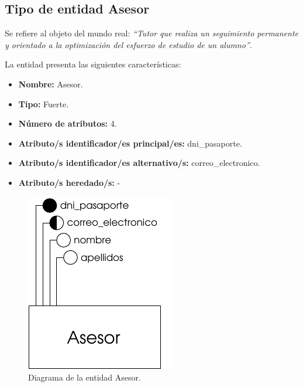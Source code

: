\subsection{Tipo de entidad Asesor}

   \begin{description}

   \item[Definición] Se refiere al objeto del mundo real: \emph{``Tutor que
        realiza un seguimiento permanente y orientado a la optimización del
        esfuerzo de estudio de un alumno''}.

   \item[Características] La entidad presenta las siguientes características:
      \begin{itemize}
         \item \textbf{Nombre:} Asesor.
         \item \textbf{Tipo:} Fuerte.
         \item \textbf{Número de atributos:} 4.
         \item \textbf{Atributo/s identificador/es principal/es:} dni\_pasaporte.
         \item \textbf{Atributo/s identificador/es alternativo/s:} correo\_electronico.
         \item \textbf{Atributo/s heredado/s:} -
      \end{itemize}

   \item[Diagrama]
   \item \begin{figure}[h!]
            \begin{center}
            \includegraphics[]{07.Modelo_Entidad-Interrelacion/7.2.Analisis_Entidades/diagramas/asesor.pdf}
            \caption{Diagrama de la entidad Asesor.}
            \end{center}
         \end{figure}


\end{description}
